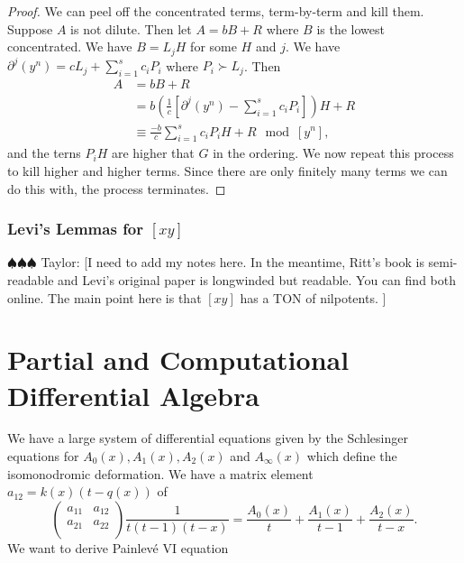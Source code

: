 \documentclass[12pt]{book}
\newcommand{\taylor}[1]{{\color{blue} \sf $\spadesuit\spadesuit\spadesuit$ Taylor: [#1]}}
\numberwithin{equation}{section}
\theoremstyle{definition}
\theoremstyle{remark}
\begin{document}
\begin{proof}
	We can peel off the concentrated terms, term-by-term and kill them. 
	Suppose $A$ is not dilute. 
	Then let $A=bB+R$ where $B$ is the lowest concentrated. 
	We have $B = L_j H$ for some $H$ and $j$. 
	We have $\partial^j(y^n) = cL_j + \sum_{i=1}^s c_i P_i$ where $P_i \succ L_j$. 
	Then 
	\begin{align*}
	A &= bB+R \\
	&= b \left( \frac{1}{c} \left[ \partial^j(y^n) - \sum_{i=1}^s c_i P_i \right] \right)H + R\\
	&\equiv \frac{-b}{c} \sum_{i=1}^s c_i P_i H + R \mod [y^n],
	\end{align*}
	and the terns $P_iH$ are higher that $G$ in the ordering. 
	We now repeat this process to kill higher and higher terms. 
	Since there are only finitely many terms we can do this with, the process terminates. 
\end{proof}

\subsection{Levi's Lemmas for $[xy]$}

\taylor{I need to add my notes here. In the meantime, Ritt's book is semi-readable and Levi's original paper is longwinded but readable. 
	You can find both online. 
	The main point here is that $[xy]$ has a TON of nilpotents.
}



\chapter{Partial and Computational Differential Algebra}\label{S:computational}

We have a large system of differential equations given by the Schlesinger equations for $A_0(x),A_1(x),A_2(x)$ and $A_{\infty}(x)$ which define the isomonodromic deformation. 
We have a matrix element $a_{12}=k(x)(t-q(x))$ of 
$$\begin{pmatrix}
a_{11} & a_{12} \\ a_{21} & a_{22} \\
\end{pmatrix} \frac{1}{t(t-1)(t-x)} = \frac{A_0(x)}{t}+\frac{A_1(x)}{t-1}+\frac{A_2(x)}{t-x}.$$
We want to derive Painlev\'e VI equation
\begin{align*}
\end{align*}
\end{document}
